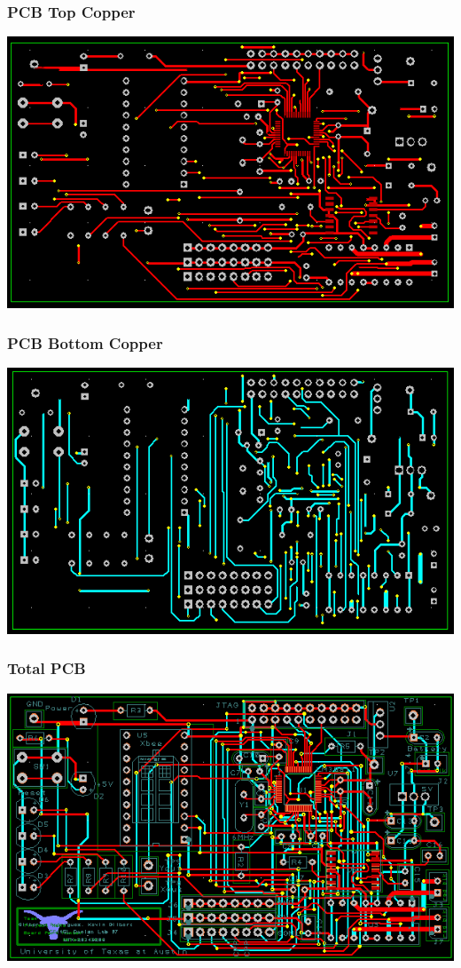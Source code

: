 \documentclass[twoside]{article}
\begin{document}
    	\subsubsection{PCB Top Copper}
        	\includegraphics[width=\textwidth]{topCopper}		
		\subsubsection{PCB Bottom Copper}
       	    \includegraphics[width=\textwidth]{bottomCopper}  
    	\subsubsection{Total PCB}
        	\includegraphics[width=\textwidth]{pcb}
            
\end{document}
